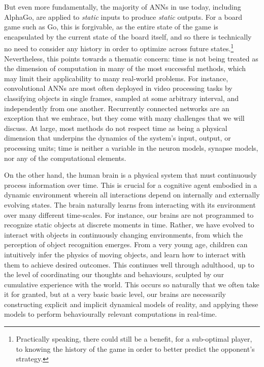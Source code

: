 But even more fundamentally, the majority of ANNs in use today, including AlphaGo, are applied to \emph{static} inputs to produce \emph{static} outputs.
For a board game such as Go, this is forgivable, as the entire state of the game is encapsulated by the current state of the board itself, and so there is technically no need to consider any history in order to optimize across future states.\footnote{
Practically speaking, there could still be a benefit, for a sub-optimal player, to knowing the history of the game in order to better predict the opponent's strategy.}
Nevertheless, this points towards a thematic concern: time is not being treated as the dimension of computation in many of the most successful methods, which may limit their applicability to many real-world problems.
For instance, convolutional ANNs are most often deployed in video processing tasks by classifying objects in single frames,  %
sampled at some arbitrary interval, and independently from one another.
Recurrently connected networks are an exception that we embrace, but they come with many challenges that we will discuss.
At large, most methods do not respect time as being a physical dimension that underpins the dynamics of the system's input, output, or processing units;
time is neither a variable in the neuron models, synapse models, nor any of the computational elements.

On the other hand, the human brain is a physical system that must continuously process information over time.
This is crucial for a cognitive agent embodied in a dynamic environment wherein all interactions depend on internally and externally evolving states.
The brain naturally learns from interacting with its environment over many different time-scales. 
For instance, our brains are not programmed to recognize static objects at discrete moments in time.
Rather, we have evolved to interact with objects in continuously changing environments, from which the perception of object recognition emerges.
From a very young age, children can intuitively infer the physics of moving objects, and learn how to interact with them to achieve desired outcomes.
This continues well through adulthood, up to the level of coordinating our thoughts and behaviours, sculpted by our cumulative experience with the world.
This occurs so naturally that we often take it for granted, but at a very basic basic level, our brains are necessarily constructing explicit and implicit dynamical models of reality, and applying these models
to perform behaviourally relevant computations in real-time.

